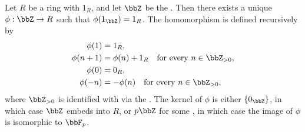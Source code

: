 \begin{theorem} \label{theorem:integers_universal_property}
    Let $R$ be a ring with  $1_R$, and let $\bbZ$ be the . Then there exists a unique  $\phi: \bbZ \to R$ such that $\phi(1_\bbZ) = 1_R$. The homomorphism is defined recursively by
    \begin{align*}
        \phi(1) &= 1_R, \\
        \phi(n+1) &= \phi(n) + 1_R \quad\text{for every } n \in \bbZ_{> 0}, \\
        \phi(0) &= 0_R, \\
        \phi(-n) &= -\phi(n) \quad\text{for every } n \in \bbZ_{> 0},
    \end{align*}
    where $\bbZ_{> 0}$ is identified with  via the .
    The kernel of $\phi$ is either $\{0_\bbZ\}$, in which case $\bbZ$ embeds into $R$, or $p\bbZ$ for some , in which case the image of $\phi$ is isomorphic to $\bbF_p$.
\end{theorem}

